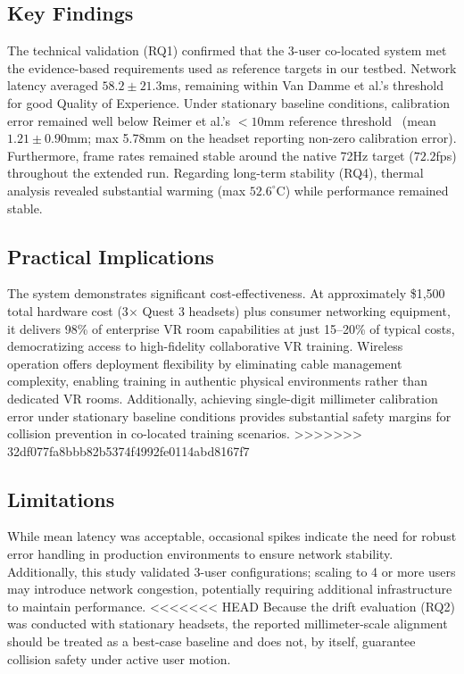 \subsection{Key Findings}

The technical validation (RQ1) confirmed that the 3-user co-located system met the evidence-based requirements used as reference targets in our testbed. Network latency averaged $58.2 \pm 21.3$ms, remaining within Van Damme et al.'s threshold~\cite{VanDammeSam2024Iolo} for good Quality of Experience. Under stationary baseline conditions, calibration error remained well below Reimer et al.'s $<10$mm reference threshold~\cite{ReimerDennis2021CfSV} (mean $1.21 \pm 0.90$mm; max 5.78mm on the headset reporting non-zero calibration error). Furthermore, frame rates remained stable around the native 72Hz target ($72.2$fps) throughout the extended run. Regarding long-term stability (RQ4), thermal analysis revealed substantial warming (max $52.6^{\circ}$C) while performance remained stable.

\subsection{Practical Implications}

The system demonstrates significant cost-effectiveness. At approximately \$1,500 total hardware cost (3$\times$ Quest 3 headsets) plus consumer networking equipment, it delivers 98\% of enterprise VR room capabilities at just 15--20\% of typical costs, democratizing access to high-fidelity collaborative VR training. Wireless operation offers deployment flexibility by eliminating cable management complexity, enabling training in authentic physical environments rather than dedicated VR rooms. Additionally, achieving single-digit millimeter calibration error under stationary baseline conditions provides substantial safety margins for collision prevention in co-located training scenarios.
>>>>>>> 32df077fa8bbb82b5374f4992fe0114abd8167f7

\subsection{Limitations}

While mean latency was acceptable, occasional spikes indicate the need for robust error handling in production environments to ensure network stability. Additionally, this study validated 3-user configurations; scaling to 4 or more users may introduce network congestion, potentially requiring additional infrastructure to maintain performance.
<<<<<<< HEAD
Because the drift evaluation (RQ2) was conducted with stationary headsets, the reported millimeter-scale alignment should be treated as a best-case baseline and does not, by itself, guarantee collision safety under active user motion.


